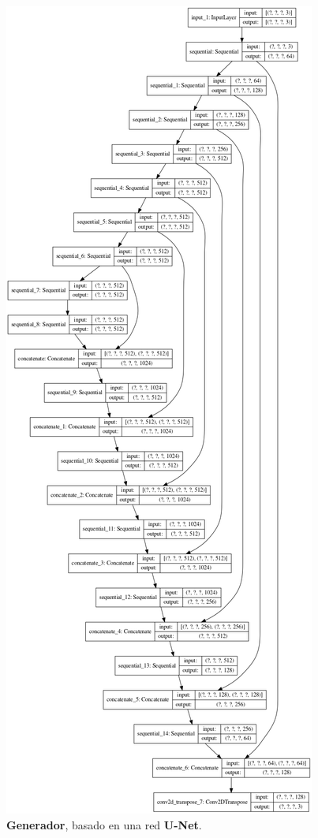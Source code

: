 \documentclass[10pt,journal,compsoc]{IEEEtran}\usepackage[T1]{fontenc}                              %
\begin{document}
\begin{figure}[!htb]
  \begin{center}
    \includegraphics[width=\linewidth]{./imgs/15_generador.png}
    \caption{\textbf{Generador}, basado en una red \textbf{U-Net}.}
    \label{fig:101}
  \end{center}
\end{figure}
\end{document}
